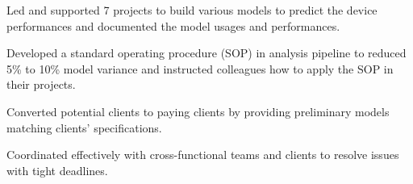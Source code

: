 \documentclass[letterpaper]{deedy-resume-openfont}
\begin{document}
\begin{tightemize}
\item Led and supported 7 projects to build various models to predict the device performances and documented the model usages and performances.
\item Developed a standard operating procedure (SOP) in analysis pipeline to reduced 5\% to 10\% model variance and instructed colleagues how to apply the SOP in their projects.
\item Converted potential clients to paying clients by providing preliminary models matching clients' specifications.
\item Coordinated effectively with cross-functional teams and clients to resolve issues with tight deadlines.

\end{tightemize}
\sectionsep


\end{document}
